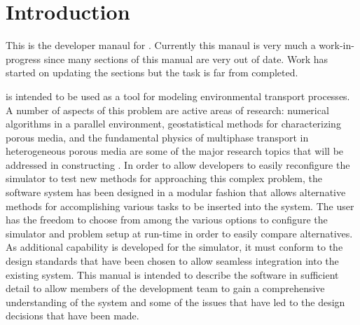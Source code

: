
\chapter{Introduction}
\label{Introduction}

This is the developer manaul for \parflow{}.  Currently this manaul is
very much a work-in-progress since many sections of this manual are
very out of date.  Work has started on updating the sections but the task is far from
completed.

\parflow{} is intended to be used as a tool for modeling environmental
transport processes.  A number of aspects of this problem are active
areas of research: numerical algorithms in a parallel environment,
geostatistical methods for characterizing porous media, and the
fundamental physics of multiphase transport in heterogeneous porous
media are some of the major research topics that will be addressed in
constructing \parflow{}.  In order to allow developers to easily
reconfigure the \parflow{} simulator to test new methods for
approaching this complex problem, the software system has been
designed in a modular fashion that allows alternative methods for
accomplishing various tasks to be inserted into the system.  The user
has the freedom to choose from among the various options to configure
the simulator and problem setup at run-time in order to easily compare
alternatives.  As additional capability is developed for the
\parflow{} simulator, it must conform to the design standards that
have been chosen to allow seamless integration into the existing
system.  This manual is intended to describe the \parflow{} software
in sufficient detail to allow members of the \parflow{} development
team to gain a comprehensive understanding of the \parflow{} system
and some of the issues that have led to the design decisions that have
been made.


